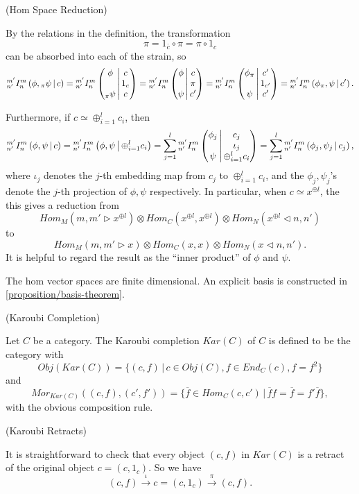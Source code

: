 \begin{remark}\label{remark/hom-space-reduction} (Hom Space Reduction)

  \noindent By the relations in the definition, the transformation
  \[
    \pi = 1_{\overline{c}} \circ \pi = \pi \circ 1_{c}
  \]
  can be absorbed into each of the strain, so
  \[
    {}^{m'}_{n'} I^{m}_{n} \left( \phi, {}_{\pi}\psi \,\middle|\, c \right) =
    {}^{m'}_{n'} I^{m}_{n} \left( \begin{matrix} \phi \\ {}\\ {}_{\pi}\psi \end{matrix} \,\middle|\, \begin{matrix} c \\ 1_{c} \\ c \end{matrix} \right) =
    {}^{m'}_{n'} I^{m}_{n} \left( \begin{matrix} \phi \\ {}\\ \psi \end{matrix} \,\middle|\, \begin{matrix} c \\ \pi \\ c' \end{matrix} \right) =
    {}^{m'}_{n'} I^{m}_{n} \left( \begin{matrix} \phi_{\pi} \\ {}\\ \psi \end{matrix} \,\middle|\, \begin{matrix} c' \\ 1_{c'} \\ c' \end{matrix} \right) =
    {}^{m'}_{n'} I^{m}_{n} \left( \phi_{\pi}, \psi \,\middle|\, c' \right).
  \]

  \noindent Furthermore, if $c \simeq \oplus_{i=1}^{l} c_{i}$, then
  \[
    {}^{m'}_{n'} I^{m}_{n} \left( \phi, \psi \,\middle|\, c \right) = {}^{m'}_{n'} I^{m}_{n} \left( \phi, \psi \,\middle|\, \oplus_{i=1}^{l} c_{i} \right) = \sum_{j=1}^{l} {}^{m'}_{n'} I^{m}_{n} \left( \begin{matrix} \phi_{j} \\ {}\\ \psi \end{matrix} \,\middle|\, \begin{matrix} c_{j} \\ \iota_{j} \\ \oplus_{i=1}^{l} c_{i} \end{matrix} \right) =
    \sum_{j=1}^{l}{}^{m'}_{n'} I^{m}_{n} \left( \phi_{j}, \psi_{j} \,\middle|\, c_{j} \right),
  \]
  where $\iota_{j}$ denotes the $j$-th embedding map from $c_{j}$ to
  $\oplus_{i=1}^{l}c_{i}$, and the $\phi_{j}, \psi_{j}$'s denote the $j$-th
  projection of $\phi, \psi$ respectively. In particular, when
  $c \simeq x^{\oplus l}$, the this gives a reduction from
  \[
    Hom_{M}(m, m' \rhd x^{\oplus l}) \otimes Hom_{C}(x^{\oplus l}, x^{\oplus l}) \otimes Hom_{N} (x^{\oplus l} \lhd n, n')
  \]
  to
  \[
    Hom_{M}(m, m' \rhd x) \otimes Hom_{C}(x, x) \otimes Hom_{N} (x \lhd n, n').
  \]
  It is helpful to regard the result as the ``inner product'' of $\phi$ and $\psi$.
\end{remark}

\noindent The hom vector spaces are finite dimensional. An explicit basis is
constructed in \ref{proposition/basis-theorem}.

\begin{definition} \label{definition/karoubi-completion} (Karoubi Completion)

  \noindent Let $C$ be a category. \quad The Karoubi completion $Kar(C)$ of
  $C$ is defined to be the category with
  \[
    Obj(Kar(C)) = \{(c, f) \,|\, c \in Obj(C), f \in End_{C}(c), f = f^{2}\}
  \] and
  \[
    Mor_{Kar(C)}((c,f), (c', f')) = \{\overline{f} \in Hom_{C}(c,c') \,|\, \overline{f}f = \overline{f} = f'\overline{f}\},
  \]
  with the obvious composition rule.
\end{definition}

\begin{remark} \label{remark/karoubi-retract} (Karoubi Retracts)

  \noindent It is straightforward to check that every object $(c,f)$ in
  $Kar(C)$ is a retract of the original object $c = (c, 1_{c})$. So we have
  \[
    (c, f) \xrightarrow{\iota} c = (c, 1_{c}) \xrightarrow{\pi} (c, f).
  \]
\end{remark}

